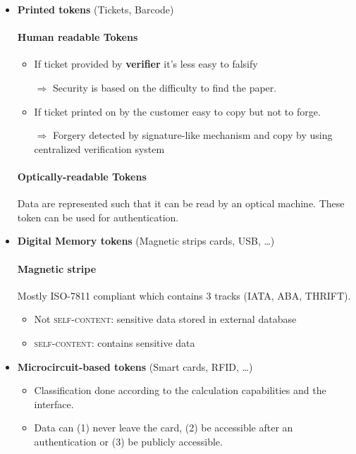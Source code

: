 \begin{itemize}
    \item \textbf{Printed tokens} (Tickets, Barcode)
        \paragraph{Human readable Tokens}
       \label{par:humanreadableTokens}

        \begin{itemize}
            \item If ticket provided by \textbf{verifier} it's less easy to
                falsify 
                
                $\Rightarrow$ Security is based on the difficulty to
                find the paper.

            \item If ticket printed on by the customer easy to copy but
                not to forge.

                $\Rightarrow$ Forgery detected by signature-like
                mechanism and
                copy by using centralized verification system
        \end{itemize}

        \paragraph{Optically-readable Tokens}

        Data are represented such that it can be read by an optical
        machine. These token can be used for authentication.

    \item \textbf{Digital Memory tokens} (Magnetic strips cards, USB, \ldots)
        \paragraph{Magnetic stripe} Mostly \textsc{ISO-7811} compliant
        which contains 3 tracks (IATA, ABA, THRIFT).
        \begin{itemize}
            \item Not \textsc{self-content}: sensitive data stored in
                external database
            \item \textsc{self-content}: contains sensitive data
        \end{itemize}

    \item \textbf{Microcircuit-based tokens}  (Smart cards, RFID, \ldots)
        \begin{itemize}
            \item Classification done according to the
                calculation capabilities and the interface.
            \item Data can (1) never leave the card, (2) be accessible after an
                authentication or (3) be publicly accessible.
        \end{itemize}

\end{itemize}
